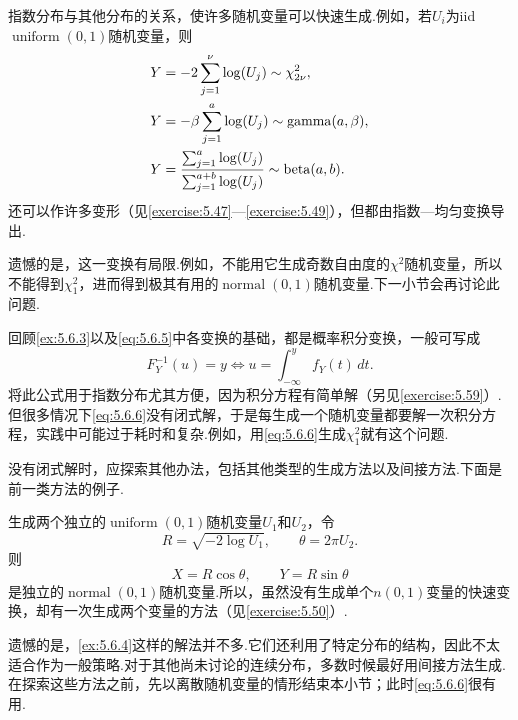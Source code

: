 指数分布与其他分布的关系，使许多随机变量可以快速生成.例如，若$U_i$为iid $\operatorname{uniform}(0,1)$随机变量，则
\begin{equation}\label{eq:5.6.5}\index{SI0255@生成}\index{SI0281@生成}\index{SI0307@生成}\index{SI0361@生成}
\begin{aligned}
Y&=-2\sum_{j=1}^\nu\log(U_j)\sim\chi_{2\nu}^2,\\
Y&=-\beta\sum_{j=1}^a\log(U_j)\sim\operatorname{gamma}(a,\beta),\\
Y&=\frac{\sum_{j=1}^a\log(U_j)}{\sum_{j=1}^{a+b}\log(U_j)}\sim\operatorname{beta}(a,b).
\end{aligned}
\end{equation}
还可以作许多变形（见\autoref{exercise:5.47}—\autoref{exercise:5.49}），但都由指数—均匀变换导出.

遗憾的是，这一变换有局限.例如，不能用它生成奇数自由度的$\chi^2$随机变量，所以不能得到$\chi_1^2$，进而得到极其有用的$\operatorname{normal}(0,1)$随机变量.下一小节会再讨论此问题.

回顾\autoref{ex:5.6.3}以及\eqref{eq:5.6.5}中各变换的基础，都是概率积分变换，一般可写成
\begin{equation}\label{eq:5.6.6}
F_Y^{-1}(u)=y\iff u=\int_{-\infty}^y f_Y(t)\,dt.
\end{equation}
将此公式用于指数分布尤其方便，因为积分方程有简单解（另见\autoref{exercise:5.59}）.但很多情况下\eqref{eq:5.6.6}没有闭式解，于是每生成一个随机变量都要解一次积分方程，实践中可能过于耗时和复杂.例如，用\eqref{eq:5.6.6}生成$\chi_1^2$就有这个问题.

没有闭式解时，应探索其他办法，包括其他类型的生成方法以及间接方法.下面是前一类方法的例子.
\begin{example}\label{ex:5.6.4}
生成两个独立的$\operatorname{uniform}(0,1)$随机变量$U_1$和$U_2$，令
$$R=\sqrt{-2\log U_1},\qquad\theta=2\pi U_2.$$
则
$$X=R\cos\theta,\qquad Y=R\sin\theta$$
是独立的$\operatorname{normal}(0,1)$随机变量.所以，虽然没有生成单个$n(0,1)$变量的快速变换，却有一次生成两个变量的方法（见\autoref{exercise:5.50}）.
\end{example}
遗憾的是，\autoref{ex:5.6.4}这样的解法并不多.它们还利用了特定分布的结构，因此不太适合作为一般策略.对于其他尚未讨论的连续分布，多数时候最好用间接方法生成.在探索这些方法之前，先以离散随机变量的情形结束本小节；此时\eqref{eq:5.6.6}很有用.

